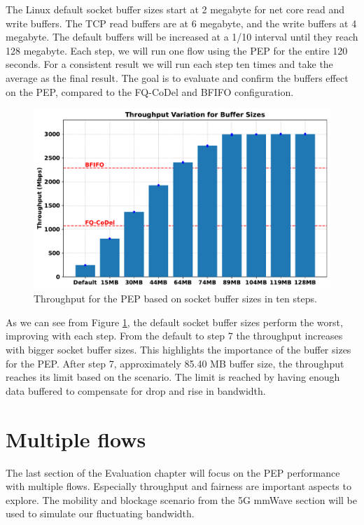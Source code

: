 \documentclass[a4paper,english, 12pt]{report}
\begin{document}
The Linux default socket buffer sizes start at 2 megabyte for net core read and write buffers. The TCP read buffers are at 6 megabyte, and the write buffers at 4 megabyte. The default buffers will be increased at a 1/10 interval until they reach 128 megabyte. Each step, we will run one flow using the PEP for the entire 120 seconds. For a consistent result we will run each step ten times and take the average as the final result. The goal is to evaluate and confirm the buffers effect on the PEP, compared to the FQ-CoDel and BFIFO configuration.\\

\begin{figure}[!h!] %
	\centering
	\includegraphics[scale=0.55]{../diagrams/witestlab/throughput/buffersizes.pdf}
  	\caption{Throughput for the PEP based on socket buffer sizes in ten steps.}
  	\label{fig:throughput_all}
\end{figure}

As we can see from Figure \ref{fig:throughput_all}, the default socket buffer sizes perform the worst, improving with each step. From the default to step 7 the throughput increases with bigger socket buffer sizes. This highlights the importance of the buffer sizes for the PEP. After step 7, approximately 85.40 MB buffer size, the throughput reaches its limit based on the scenario. The limit is reached by having enough data buffered to compensate for drop and rise in bandwidth.\\

\section{Multiple flows}
The last section of the Evaluation chapter will focus on the PEP performance with multiple flows. Especially throughput and fairness are important aspects to explore. The mobility and blockage scenario from the 5G mmWave section will be used to simulate our fluctuating bandwidth.\\
\end{document}

